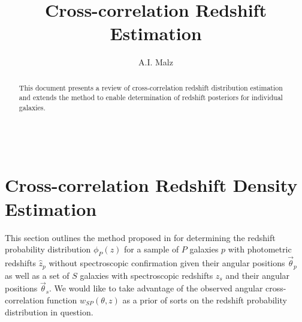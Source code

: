 \documentclass[12pt, onecolumn]{emulateapj}
\begin{document}
\begin{align}
\end{align}

\title{Cross-correlation Redshift Estimation}

\author{A.I. Malz}

\begin{abstract}
This document presents a review of cross-correlation redshift distribution estimation and extends the method to enable determination of redshift posteriors for individual galaxies.
\end{abstract}


\section{Cross-correlation Redshift Density Estimation}
\label{sec:review}

This section outlines the method proposed in \citet{new08} for determining the redshift probability distribution $\phi_{P}(z)$ for a sample of $P$ galaxies $p$ with photometric redshifts $\hat{z}_{p}$ without spectroscopic confirmation given their angular positions $\vec{\theta}_{p}$ as well as a set of $S$ galaxies with spectroscopic redshifts $z_{s}$ and their angular positions $\vec{\theta}_{s}$.  We would like to take advantage of the observed angular cross-correlation function $w_{SP}(\theta,z)$ as a prior of sorts on the redshift probability distribution in question.
\end{document}

